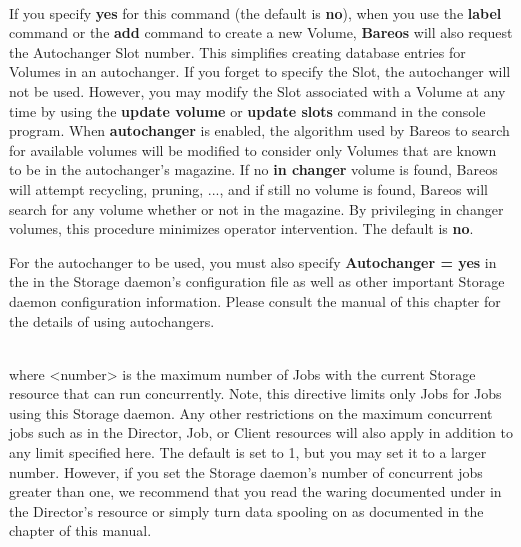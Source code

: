 \begin{description}
\label{Autochanger1}
\item [Autochanger = {\textless}yes{\textbar}no{\textgreater}] \hfill \\
If you specify {\bf yes} for this command (the default is {\bf no}),
when you use the {\bf label} command or the {\bf add} command to create
a new Volume, {\bf Bareos} will also request the Autochanger Slot
number.  This simplifies creating database entries for Volumes in an
autochanger.  If you forget to specify the Slot, the autochanger will
not be used.  However, you may modify the Slot associated with a Volume
at any time by using the {\bf update volume} or {\bf update slots}
command in the console program.  When {\bf autochanger} is enabled, the
algorithm used by Bareos to search for available volumes will be
modified to consider only Volumes that are known to be in the
autochanger's magazine.  If no {\bf in changer} volume is found, Bareos
will attempt recycling, pruning, ..., and if still no volume is found,
Bareos will search for any volume whether or not in the magazine.  By
privileging in changer volumes, this procedure minimizes operator
intervention.  The default is {\bf no}.

For the autochanger to be used, you must also specify {\bf Autochanger =
yes} in the  in the Storage daemon's
configuration file as well as other important Storage daemon
configuration information.  Please consult the  manual of this chapter for the
details of using autochangers.

\item [Maximum Concurrent Jobs = {\textless}number{\textgreater}] \hfill \\
where {\textless}number{\textgreater}  is the maximum number of Jobs with the current
Storage resource that can run concurrently.  Note, this directive limits
only Jobs for Jobs using this Storage daemon.  Any other restrictions on
the maximum concurrent jobs such as in the Director, Job, or Client
resources will also apply in addition to any limit specified here.  The
default is set to 1, but you may set it to a larger number.  However, if
you set the Storage daemon's number of concurrent jobs greater than one,
we recommend that you read the waring documented under  in the Director's resource or simply
turn data spooling on as documented in the  chapter of this manual.


\end{description}
